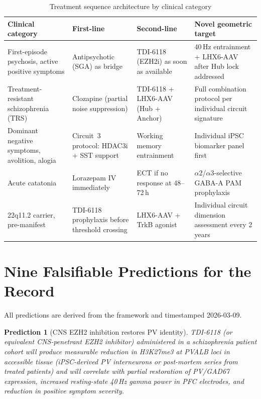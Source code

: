 \documentclass[12pt,a4paper]{article}
\newtheorem{prediction}{Prediction}
\begin{document}
\begin{table}[ht!]
\centering
\caption{Treatment sequence architecture by clinical category}
\label{tab:protocol}
\begin{tabular}{p{2.8cm}p{3.0cm}p{3.0cm}p{3.8cm}}
\toprule
\textbf{Clinical category} &
\textbf{First-line} &
\textbf{Second-line} &
\textbf{Novel geometric target} \\
\midrule
First-episode psychosis,
active positive symptoms &
Antipsychotic (SGA) as
bridge &
TDI-6118 (EZH2i) as soon
as available &
40\,Hz entrainment + LHX6-AAV
after Hub lock addressed \\[4pt]
Treatment-resistant
schizophrenia (TRS) &
Clozapine (partial noise
suppression) &
TDI-6118 + LHX6-AAV
(Hub + Anchor) &
Full combination protocol
per individual circuit
signature \\[4pt]
Dominant negative symptoms,
avolition, alogia &
Circuit~3 protocol:
HDAC3i + SST support &
Working memory entrainment &
Individual iPSC biomarker
panel first \\[4pt]
Acute catatonia &
Lorazepam IV immediately &
ECT if no response
at 48--72\,h &
$\alpha$2/$\alpha$3-selective
GABA-A PAM prophylaxis \\[4pt]
22q11.2 carrier,
pre-manifest &
TDI-6118 prophylaxis
before threshold crossing &
LHX6-AAV + TrkB agonist &
Individual circuit dimension
assessment every 2 years \\
\bottomrule
\end{tabular}
\end{table}

\section{Nine Falsifiable Predictions for the Record}

All predictions are derived from the framework and timestamped
2026-03-09.

\begin{prediction}[CNS EZH2 inhibition restores PV identity]
\label{pred:ezh2i}
TDI-6118 (or equivalent CNS-penetrant EZH2 inhibitor)
administered in a schizophrenia patient cohort will produce
measurable reduction in H3K27me3 at PVALB loci in accessible
tissue (iPSC-derived PV interneurons or post-mortem series
from treated patients) and will correlate with partial
restoration of PV/GAD67 expression, increased resting-state
40\,Hz gamma power in PFC electrodes, and reduction in
positive symptom severity.
\end{prediction}
\end{document}

